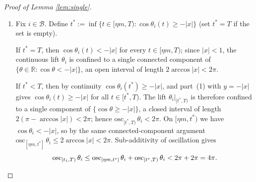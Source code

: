 \documentclass[10pt,a4paper]{amsart}
\newcommand{\R}{\mathbb{R}}
\begin{document}
\begin{proof}[Proof of Lemma \ref{lem:single}]
\begin{enumerate}
If there were another time $t_2\in [t_0+\varepsilon,T)$ for which $\cos\theta_i(t_2)\le y$, then by making $t_2$ the earliest such time, we must have $\cos\theta_i(t_2)=y$, and the same computation as above shows that $\frac{d}{dt}\cos\theta_i(t_2)>0$, giving a contradiction (as there would be times slightly smaller than $t_2$ at which $\cos\theta_i<y$, violating the minimality of $t_2$).

By this exit-time argument, we have $\cos\theta_i(t)\ge y$ for all $t\in[t_0,T)$ (and in fact, the stronger statement that $\cos\theta_i(t)>y$ for $t\in (t_0,T)$).

The latter statement follows from $y>-1$, and the continuity of $\theta_i$ in $t$. More explicitly, $\theta_i|_{[t_1,T)}$ is confined to a single component of $\{\cos\theta\ge -|x|\}$, a closed
interval of length $2(\pi-\arccos|x|)<2\pi$; hence
$\mathrm{osc}_{[t_1,T)}\,\theta_i<2\pi$. 
\item Fix $i\in\mathcal{B}$. Define
$t^{*}:=\inf\{t\in[\eta m,T):\cos\theta_i(t)\ge -|x|\}$
(set $t^{*}=T$ if the set is empty).

If $t^{*}=T$, then $\cos\theta_i(t)<-|x|$ for every $t\in[\eta m,T)$;
since $|x|<1$, the continuous lift $\theta_i$ is confined to a single
connected component of $\{\theta\in\R:\cos\theta<-|x|\}$, an open
interval of length $2\arccos|x|<2\pi$.

If $t^{*}<T$, then by continuity $\cos\theta_i(t^{*})\ge -|x|$, and
part~(1) with $y=-|x|$ gives $\cos\theta_i(t)\ge -|x|$ for all
$t\in[t^{*},T)$. The lift $\theta_i|_{[t^{*},T)}$ is therefore
confined to a single component of $\{\cos\theta\ge -|x|\}$, a closed
interval of length $2(\pi-\arccos|x|)<2\pi$; hence
$\mathrm{osc}_{[t^{*},T)}\,\theta_i<2\pi$. On $[\eta m,t^{*})$ we
have $\cos\theta_i<-|x|$, so by the same connected-component argument
$\mathrm{osc}_{[\eta m,t^{*}]}\,\theta_i\le 2\arccos|x|<2\pi$.
Sub-additivity of oscillation gives
\[
\mathrm{osc}_{[t_1,T)}\,\theta_i\le \mathrm{osc}_{[\eta m,t^{*}]}\,\theta_i+\mathrm{osc}_{[t^{*},T)}\,\theta_i
<2\pi+2\pi=4\pi.\qedhere
\]

\end{enumerate}
\end{proof}
\end{document}
